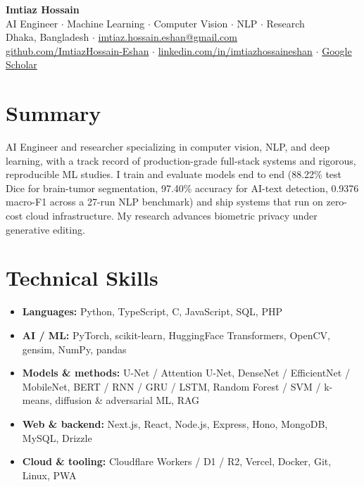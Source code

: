 \documentclass[11pt,a4paper]{article}
\begin{document}
\begin{center}
  {\huge\bfseries Imtiaz Hossain}\\[0.3em]
  {\color{accent} AI Engineer $\cdot$ Machine Learning $\cdot$ Computer Vision $\cdot$ NLP $\cdot$ Research}\\[0.4em]
  Dhaka, Bangladesh $\cdot$ \href{mailto:imtiaz.hossain.eshan@gmail.com}{imtiaz.hossain.eshan@gmail.com}\\
  \href{https://github.com/ImtiazHossain-Eshan}{github.com/ImtiazHossain-Eshan} $\cdot$
  \href{https://www.linkedin.com/in/imtiazhossaineshan/}{linkedin.com/in/imtiazhossaineshan} $\cdot$
  \href{https://scholar.google.com/citations?user=CIjeZSsAAAAJ}{Google Scholar}
\end{center}

\section{Summary}
AI Engineer and researcher specializing in computer vision, NLP, and deep learning, with a track record of production-grade full-stack systems and rigorous, reproducible ML studies. I train and evaluate models end to end (88.22\% test Dice for brain-tumor segmentation, 97.40\% accuracy for AI-text detection, 0.9376 macro-F1 across a 27-run NLP benchmark) and ship systems that run on zero-cost cloud infrastructure. My research advances biometric privacy under generative editing.

\section{Technical Skills}
\begin{itemize}
  \item \textbf{Languages:} Python, TypeScript, C, JavaScript, SQL, PHP
  \item \textbf{AI / ML:} PyTorch, scikit-learn, HuggingFace Transformers, OpenCV, gensim, NumPy, pandas
  \item \textbf{Models \& methods:} U-Net / Attention U-Net, DenseNet / EfficientNet / MobileNet, BERT / RNN / GRU / LSTM, Random Forest / SVM / k-means, diffusion \& adversarial ML, RAG
  \item \textbf{Web \& backend:} Next.js, React, Node.js, Express, Hono, MongoDB, MySQL, Drizzle
  \item \textbf{Cloud \& tooling:} Cloudflare Workers / D1 / R2, Vercel, Docker, Git, Linux, PWA
\end{itemize}
\end{document}
